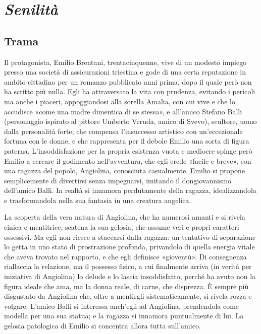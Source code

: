 \documentclass[a4paper, twoside, titlepage]{book}
\begin{document}
\chapter{\textit{Senilità}}

\section{Trama}
Il protagonista, Emilio Brentani, trentacinquenne, vive di un modesto impiego presso una società di assicurazioni triestina e gode di una certa reputazione in ambito cittadino per un romanzo pubblicato anni prima, dopo il quale però non ha scritto più nulla. Egli ha attraversato la vita con prudenza, evitando i pericoli ma anche i piaceri, appoggiandosi alla sorella Amalia, con cui vive e che lo accudisce «come una madre dimentica di se stessa», e all'amico Stefano Balli (personaggio ispirato al pittore Umberto Veruda, amico di Svevo), scultore, uomo dalla personalità forte, che compensa l'insuccesso artistico con un'eccezionale fortuna con le donne, e che rappresenta per il debole Emilio una sorta di figura paterna. L'insoddisfazione per la propria esistenza vuota e mediocre spinge però Emilio a cercare il godimento nell'avventura, che egli crede «facile e breve», con una ragazza del popolo, Angiolina, conosciuta casualmente. Emilio si propone semplicemente di divertirsi senza impegnarsi, imitando il dongiovannismo dell'amico Balli. In realtà si innamora perdutamente della ragazza, idealizzandola e trasformandola nella sua fantasia in una creatura angelica.

La scoperta della vera natura di Angiolina, che ha numerosi amanti e si rivela cinica e mentitrice, scatena la sua gelosia, che assume veri e propri caratteri ossessivi. Ma egli non riesce a staccarsi dalla ragazza: un tentativo di separazione lo getta in uno stato di prostrazione profonda, privandolo di quella energia vitale che aveva trovato nel rapporto, e che egli definisce «gioventù». Di conseguenza riallaccia la relazione, ma il possesso fisico, a cui finalmente arriva (in verità per iniziativa di Angiolina) lo delude e lo lascia insoddisfatto, perché ha avuto non la figura ideale che ama, ma la donna reale, di carne, che disprezza. È sempre più disgustato da Angiolina che, oltre a mentirgli sistematicamente, si rivela rozza e volgare. L'amico Balli si interessa anch'egli ad Angiolina, prendendola come modella per una sua statua; e la ragazza si innamora puntualmente di lui. La gelosia patologica di Emilio si concentra allora tutta sull'amico.
\end{document}

